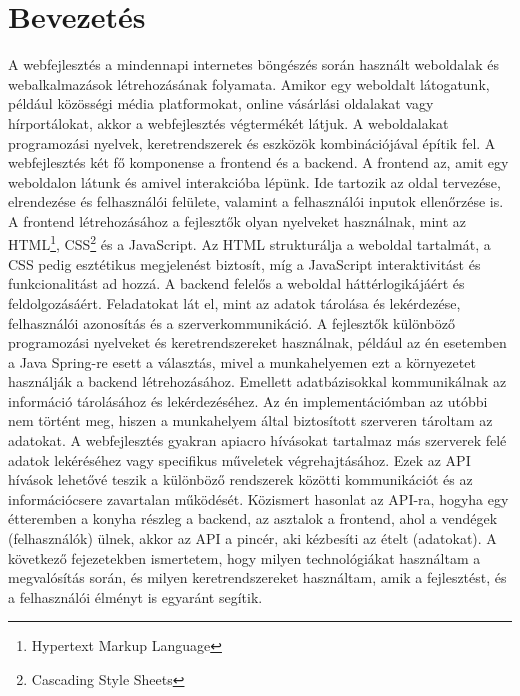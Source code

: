 \documentclass[a4paper,twoside]{article}
\begin{document}
\section{Bevezetés}
A webfejlesztés a mindennapi internetes böngészés során használt weboldalak és
webalkalmazások létrehozásának folyamata. Amikor egy weboldalt látogatunk, például
közösségi média platformokat, online vásárlási oldalakat vagy hírportálokat, akkor a
webfejlesztés végtermékét látjuk.
A weboldalakat programozási nyelvek, keretrendszerek és eszközök kombinációjával építik
fel. A webfejlesztés két fő komponense a frontend és a backend.
A frontend az, amit egy weboldalon látunk és amivel interakcióba lépünk. Ide tartozik az
oldal tervezése, elrendezése és felhasználói felülete, valamint a felhasználói inputok
ellenőrzése is. A frontend létrehozásához a fejlesztők olyan nyelveket használnak, mint az
HTML\footnote{Hypertext Markup Language}, CSS\footnote{Cascading Style Sheets} és a JavaScript. Az
HTML strukturálja a weboldal tartalmát, a CSS pedig esztétikus megjelenést biztosít, míg a
JavaScript interaktivitást és funkcionalitást ad hozzá.
A backend felelős a weboldal háttérlogikájáért és feldolgozásáért. Feladatokat lát el, mint az
adatok tárolása és lekérdezése, felhasználói azonosítás és a szerverkommunikáció. A
fejlesztők különböző programozási nyelveket és keretrendszereket használnak, például az én esetemben a
Java Spring\cite{javaspring}-re esett a választás, mivel a munkahelyemen ezt a környezetet használják a
backend létrehozásához. Emellett adatbázisokkal kommunikálnak az információ tárolásához
és lekérdezéséhez. Az én implementációmban az utóbbi nem történt meg, hiszen a
munkahelyem által biztosított szerveren tároltam az adatokat.
A webfejlesztés gyakran \acrshort{apiacro} hívásokat tartalmaz más
szerverek felé adatok lekéréséhez vagy specifikus műveletek végrehajtásához. Ezek az API
hívások lehetővé teszik a különböző rendszerek közötti kommunikációt és az információcsere
zavartalan működését. Közismert hasonlat az API-ra, hogyha egy étteremben a konyha
részleg a backend, az asztalok a frontend, ahol a vendégek (felhasználók) ülnek, akkor az API
a pincér, aki kézbesíti az ételt (adatokat).
A következő fejezetekben ismertetem, hogy milyen technológiákat használtam a megvalósítás során, és milyen keretrendszereket használtam, amik a fejlesztést, és a felhasználói élményt is
egyaránt segítik.
\newpage
\end{document}
